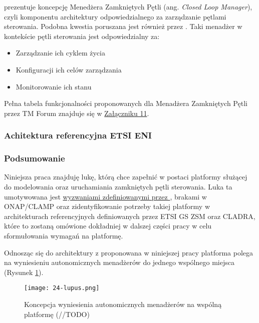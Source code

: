 \cite{tmforum2022ai} prezentuje koncepcję Menedżera Zamkniętych Pętli (ang. \textit{Closed Loop Manager}), czyli komponentu architektury odpowiedzialnego za zarządzanie pętlami sterowania. Podobna kwestia poruszana jest również przez \cite{ngmn2022}. Taki menadżer w kontekście pętli sterowania jest odpowiedzialny za:
\begin{itemize}
    \item Zarządzanie ich cyklem życia 
    \item Konfiguracji ich celów zarządzania
    \item Monitorowanie ich stanu
\end{itemize}

Pełna tabela funkcjonalności proponowanych dla Menadżera Zamkniętych Pętli przez TM Forum znajduje się w \hyperlink{appendix:11}{Załączniku 11}.

\subsubsection{Achitektura referencyjna ETSI ENI}



\subsubsection{Podsumowanie}

Niniejsza praca znajduję lukę, którą chce zapełnić w postaci platformy służącej do modelowania oraz uruchamiania zamkniętych pętli sterowania. Luka ta umotywowana jest \hyperlink{list:1}{wyzwaniami zdefiniowanymi przez \cite{fallon2019}}, brakami w ONAP/CLAMP oraz zidentyfikowanie potrzeby takiej platformy w architekturach referencyjnych definiowanych przez ETSI GS ZSM oraz CLADRA, które to zostaną omówione dokładniej w dalszej części pracy w celu sformułowania wymagań na platformę. 

Odnosząc się do architektury z \cite{kephart2003} proponowana w niniejszej pracy platforma polega na wyniesieniu autonomicznych menadżerów do jednego wspólnego miejsca (Rysunek \ref{fig:24-lupus}).

\begin{figure}[!htbp]
    \centering \texttt{[image: 24-lupus.png]}
    \caption{Koncepcja wyniesienia autonomicznych menadżerów na wspólną platformę (//TODO)}\label{fig:24-lupus}
\end{figure}